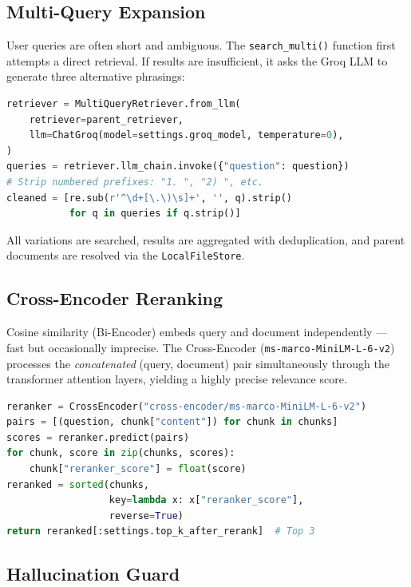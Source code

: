 \documentclass[12pt,a4paper]{report}
\begin{document}
\subsection{Multi-Query Expansion}

User queries are often short and ambiguous. The \texttt{search\_multi()} function first attempts a direct retrieval. If results are insufficient, it asks the Groq LLM to generate three alternative phrasings:

\begin{lstlisting}[language=Python, caption=Multi-Query expansion and query cleaning]
retriever = MultiQueryRetriever.from_llm(
    retriever=parent_retriever,
    llm=ChatGroq(model=settings.groq_model, temperature=0),
)
queries = retriever.llm_chain.invoke({"question": question})
# Strip numbered prefixes: "1. ", "2) ", etc.
cleaned = [re.sub(r'^\d+[\.\)\s]+', '', q).strip()
           for q in queries if q.strip()]
\end{lstlisting}

All variations are searched, results are aggregated with deduplication, and parent documents are resolved via the \texttt{LocalFileStore}.

\subsection{Cross-Encoder Reranking}

Cosine similarity (Bi-Encoder) embeds query and document independently — fast but occasionally imprecise. The Cross-Encoder (\texttt{ms-marco-MiniLM-L-6-v2}) processes the \emph{concatenated} (query, document) pair simultaneously through the transformer attention layers, yielding a highly precise relevance score.

\begin{lstlisting}[language=Python, caption=Cross-Encoder scoring and top-k selection]
reranker = CrossEncoder("cross-encoder/ms-marco-MiniLM-L-6-v2")
pairs = [(question, chunk["content"]) for chunk in chunks]
scores = reranker.predict(pairs)
for chunk, score in zip(chunks, scores):
    chunk["reranker_score"] = float(score)
reranked = sorted(chunks,
                  key=lambda x: x["reranker_score"],
                  reverse=True)
return reranked[:settings.top_k_after_rerank]  # Top 3
\end{lstlisting}

\subsection{Hallucination Guard}
\end{document}
